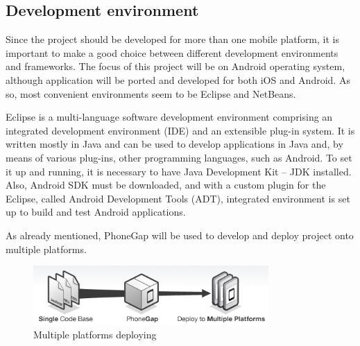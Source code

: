 \pagebreak
\subsection{Development environment}

Since the project should be developed for more than one mobile platform, it is important to make a good choice between different development environments and frameworks. The focus of this project will be on Android operating system, although application will be ported and developed for both iOS and Android.
As so, most convenient environments seem to be Eclipse and NetBeans.\newline

Eclipse is a multi-language software development environment comprising an integrated development environment (IDE) and an extensible plug-in system. It is written mostly in Java and can be used to develop applications in Java and, by means of various plug-ins, other programming languages, such as Android. 
To set it up and running, it is necessary to have Java Development Kit – JDK installed. Also, Android SDK must be downloaded, and with a custom plugin for the Eclipse, called Android Development Tools (ADT), integrated environment is set up to build and test Android applications.\newline

As already mentioned, PhoneGap will be used to develop and deploy project onto multiple platforms.\newline
\begin{figure}[phonegap]
	\centering
	\includegraphics[width=0.8\textwidth]{prestudy/development_environment/PhoneGap.jpg}
	\caption{Multiple platforms deploying}
	\label{fig:phonegap}
\end{figure}
